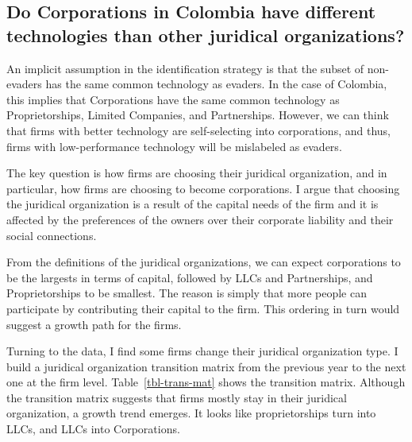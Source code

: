 \documentclass[
  12pt]{article}
\theoremstyle{definition}
\theoremstyle{remark}
\begin{document}
\subsection{Do Corporations in Colombia have different technologies than
other juridical
organizations?}\label{do-corporations-in-colombia-have-different-technologies-than-other-juridical-organizations}

An implicit assumption in the identification strategy is that the subset
of non-evaders has the same common technology as evaders. In the case of
Colombia, this implies that Corporations have the same common technology
as Proprietorships, Limited Companies, and Partnerships. However, we can
think that firms with better technology are self-selecting into
corporations, and thus, firms with low-performance technology will be
mislabeled as evaders.

The key question is how firms are choosing their juridical organization,
and in particular, how firms are choosing to become corporations. I
argue that choosing the juridical organization is a result of the
capital needs of the firm and it is affected by the preferences of the
owners over their corporate liability and their social connections.

From the definitions of the juridical organizations, we can expect
corporations to be the largests in terms of capital, followed by LLCs
and Partnerships, and Proprietorships to be smallest. The reason is
simply that more people can participate by contributing their capital to
the firm. This ordering in turn would suggest a growth path for the
firms.

Turning to the data, I find some firms change their juridical
organization type. I build a juridical organization transition matrix
from the previous year to the next one at the firm level.
Table~\ref{tbl-trans-mat} shows the transition matrix. Although the
transition matrix suggests that firms mostly stay in their juridical
organization, a growth trend emerges. It looks like proprietorships turn
into LLCs, and LLCs into Corporations.

\begin{table}

\caption{\label{tbl-trans-mat}Transition Matrix}


\end{table}%
\end{document}
